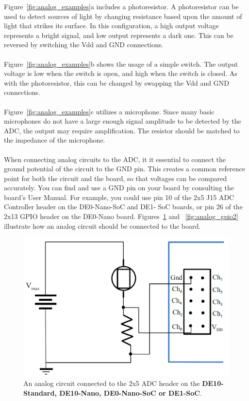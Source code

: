 \documentclass[11pt, twoside, pdftex]{article}
\begin{document}
Figure~\ref{fig:analog_examples}a includes a photoresistor. A photoresistor can be used to detect sources of light by changing resistance based upon the amount of light that strikes its surface. In this configuration, a high output voltage represents a bright signal, and low output represents a dark one. This can be reversed by switching the Vdd and GND connections.\\
\\
Figure~\ref{fig:analog_examples}b shows the usage of a simple switch. The output voltage is low when the switch is open, and high when the switch is closed. As with the photoresistor, this can be changed by swapping the Vdd and GND connections.\\
\\
Figure~\ref{fig:analog_examples}c utilizes a microphone. Since many basic microphones do not have a large enough signal amplitude to be detected by the ADC, the output may require amplification. The resistor should be matched to the impedance of the microphone.\\
\\
When connecting analog circuits to the ADC, it it essential to connect the ground potential of the circuit to the GND pin. This creates a common reference point 
for both the circuit and the board, so that voltages can be compared accurately. You can find and use a GND pin on your board by consulting the board's User Manual.
For example, you could use pin 10 of the 2x5 J15 ADC Controller header on the DE0-Nano-SoC and DE1-
SoC boards, or pin 26 of the 2x13 GPIO header on the DE0-Nano board. Figures~\ref{fig:analog_gpio} and ~\ref{fig:analog_gpio2} illustrate how an analog circuit 
should be connected to the board.
\begin {figure} [h]
\begin {center}
\includegraphics[scale=0.45] {figures/analog_gpio.png}
\end{center}
\caption {An analog circuit connected to the 2x5 ADC header on the {\bf DE10-Standard, DE10-Nano, DE0-Nano-SoC or DE1-SoC}.} 
\label{fig:analog_gpio}
\end {figure}
\end{document}
